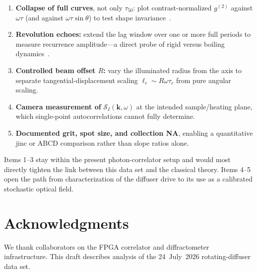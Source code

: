 \documentclass[11pt,letterpaper]{article}
\newcommand{\gtt}{g^{(2)}}
\begin{document}
\begin{enumerate}[leftmargin=1.6em]
  \item \textbf{Collapse of full curves}, not only $\tau_{50}$: plot
  contrast-normalized $\gtt$ against $\omega\tau$ (and against
  $\omega\tau\sin\theta$) to test shape invariance~\cite{Yura1998}.
  \item \textbf{Revolution echoes:} extend the lag window over one or more
  full periods to measure recurrence amplitude---a direct probe of rigid
  versus boiling dynamics~\cite{Yoshimura1986}.
  \item \textbf{Controlled beam offset $R$:} vary the illuminated radius from
  the axis to separate tangential-displacement scaling
  $\ell_c\sim R\omega\tau_c$ from pure angular scaling.
  \item \textbf{Camera measurement of} $\mathcal{S}_I(\mathbf{k},\omega)$ at
  the intended sample/heating plane, which single-point autocorrelations cannot
  fully determine.
  \item \textbf{Documented grit, spot size, and collection NA}, enabling a
  quantitative jinc or ABCD comparison rather than slope ratios alone.
\end{enumerate}

Items 1--3 stay within the present photon-correlator setup and would most
directly tighten the link between this data set and the classical theory.
Items 4--5 open the path from characterization of the diffuser drive to its use
as a calibrated stochastic optical field.

\section*{Acknowledgments}
We thank collaborators on the FPGA correlator and diffractometer infrastructure.
This draft describes analysis of the 24~July~2026 rotating-diffuser data set.



\end{document}
